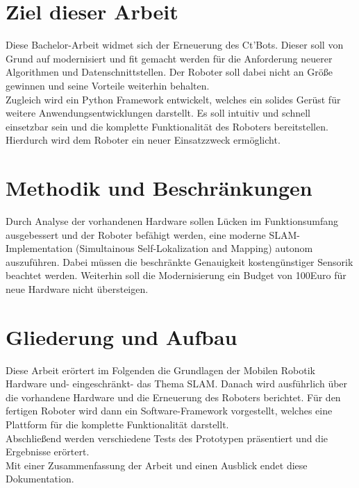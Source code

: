\documentclass[a4paper,cleardoubleempty,BCOR1cm]{book}
\begin{document}
\section{Ziel dieser Arbeit}
Diese Bachelor-Arbeit widmet sich der Erneuerung des Ct'Bots. Dieser soll von Grund auf modernisiert und fit gemacht werden für die Anforderung neuerer Algorithmen und Datenschnittstellen. Der Roboter soll dabei nicht an Größe gewinnen und seine Vorteile weiterhin behalten. \\

Zugleich wird ein Python Framework entwickelt, welches ein solides Gerüst für weitere Anwendungsentwicklungen darstellt. Es soll intuitiv und schnell einsetzbar sein und die komplette Funktionalität des Roboters bereitstellen. Hierdurch wird dem Roboter ein neuer Einsatzzweck ermöglicht. \\


\section{Methodik und Beschränkungen}

Durch Analyse der vorhandenen Hardware sollen Lücken im Funktionsumfang ausgebessert und der Roboter befähigt werden, eine moderne SLAM-Implementation (Simultainous Self-Lokalization and Mapping) autonom auszuführen. 
Dabei müssen die beschränkte Genauigkeit kostengünstiger Sensorik beachtet werden. Weiterhin soll die Modernisierung ein Budget von 100Euro für neue Hardware nicht übersteigen. 

\section{Gliederung und Aufbau}

Diese Arbeit erörtert im Folgenden die Grundlagen der Mobilen Robotik Hardware und- eingeschränkt- das Thema SLAM. Danach wird ausführlich über die vorhandene Hardware und die Erneuerung des Roboters berichtet. Für den fertigen Roboter wird dann ein Software-Framework vorgestellt, welches eine Plattform für die komplette Funktionalität darstellt. \\
Abschließend werden verschiedene  Tests des Prototypen präsentiert und die Ergebnisse erörtert. \\
Mit einer Zusammenfassung der Arbeit und einen Ausblick endet diese Dokumentation.  





\end{document}
